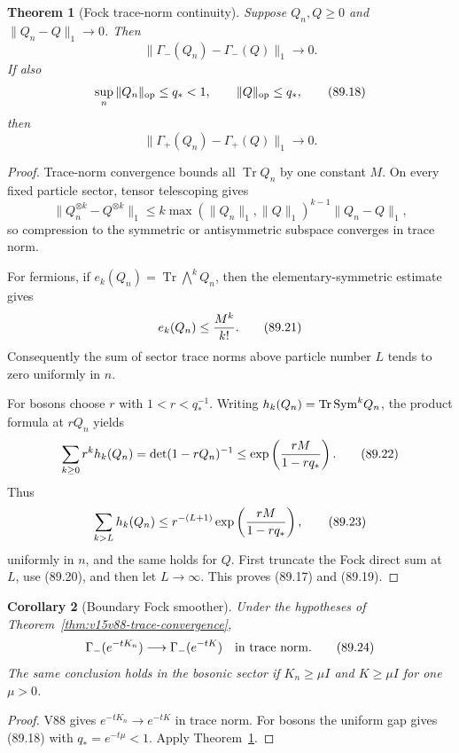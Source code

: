 \documentclass[11pt]{article}
\newtheorem{theorem}{Theorem}[section]
\newtheorem{corollary}[theorem]{Corollary}
\theoremstyle{remark}
\begin{document}
\begin{theorem}[Fock trace-norm continuity]
\label{thm:v15v89-fock-continuity}
Suppose \(Q_n,Q\geq0\) and \(\|Q_n-Q\|_1\to0\).
Then
\[
 \|\Gamma_-(Q_n)-\Gamma_-(Q)\|_1\to0.               \tag{89.17}
\]
If also
\[
 \sup_n\|Q_n\|_{\rm op}\leq q_*<1,
 \qquad \|Q\|_{\rm op}\leq q_*,                     \tag{89.18}
\]
then
\[
 \|\Gamma_+(Q_n)-\Gamma_+(Q)\|_1\to0.               \tag{89.19}
\]
\end{theorem}

\begin{proof}
Trace-norm convergence bounds all \(\operatorname{Tr}Q_n\) by one
constant \(M\).  On every fixed particle sector, tensor
telescoping gives
\[
 \|Q_n^{\otimes k}-Q^{\otimes k}\|_1
 \leq k\max(\|Q_n\|_1,\|Q\|_1)^{k-1}\|Q_n-Q\|_1,    \tag{89.20}
\]
so compression to the symmetric or antisymmetric subspace
converges in trace norm.

For fermions, if \(e_k(Q_n)=\operatorname{Tr}\bigwedge^kQ_n\),
then the elementary-symmetric estimate gives
\[
 e_k(Q_n)\leq {M^k\over k!}.                          \tag{89.21}
\]
Consequently the sum of sector trace norms above particle number
\(L\) tends to zero uniformly in \(n\).

For bosons choose \(r\) with \(1<r<q_*^{-1}\).  Writing
\(h_k(Q_n)=\operatorname{Tr}{\rm Sym}^kQ_n\), the product formula
at \(rQ_n\) yields
\[
 \sum_{k\geq0}r^kh_k(Q_n)
 =\det(1-rQ_n)^{-1}
 \leq \exp\left({rM\over1-rq_*}\right).              \tag{89.22}
\]
Thus
\[
 \sum_{k>L}h_k(Q_n)
 \leq r^{-(L+1)}
      \exp\left({rM\over1-rq_*}\right),              \tag{89.23}
\]
uniformly in \(n\), and the same holds for \(Q\).  First truncate
the Fock direct sum at \(L\), use (89.20), and then let
\(L\to\infty\).  This proves (89.17) and (89.19).
\end{proof}

\begin{corollary}[Boundary Fock smoother]
\label{cor:v15v89-boundary}
Under the hypotheses of Theorem~\ref{thm:v15v88-trace-convergence},
\[
 \Gamma_-(e^{-tK_n})\longrightarrow\Gamma_-(e^{-tK})
 \quad\hbox{in trace norm}.                            \tag{89.24}
\]
The same conclusion holds in the bosonic sector if
\(K_n\geq\mu I\) and \(K\geq\mu I\) for one \(\mu>0\).
\end{corollary}

\begin{proof}
V88 gives \(e^{-tK_n}\to e^{-tK}\) in trace norm.  For bosons the
uniform gap gives (89.18) with \(q_*=e^{-t\mu}<1\).  Apply
Theorem~\ref{thm:v15v89-fock-continuity}.
\end{proof}
\end{document}
